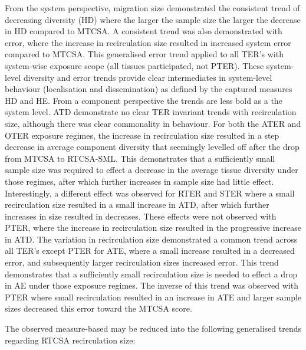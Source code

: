 From the system perspective, migration size demonstrated the consistent trend of decreasing diversity (HD) where the larger the sample size the larger the decrease in HD compared to MTCSA. 
A consistent trend was also demonstrated with error, where the increase in recirculation size resulted in increased system error compared to MTCSA. This generalised error trend applied to all TER's with system-wise exposure scope (all tissues participated, not PTER). These system-level diversity and error trends provide clear intermediates in system-level behaviour (localisation and dissemination) as defined by the captured measures HD and HE.
From a component perspective the trends are less bold as a the system level.
ATD demonstrate no clear TER invariant trends with recirculation size, although there was clear commonality in behaviour. For both the ATER and OTER exposure regimes, the increase in recirculation size resulted in a step decrease in average component diversity that seemingly levelled off after the drop from MTCSA to RTCSA-SML. This demonstrates that a sufficiently small sample size was required to effect a decrease in the average tissue diversity under those regimes, after which further increases in sample size had little effect. Interestingly, a different effect was observed for RTER and STER where a small recirculation size resulted in a small increase in ATD, after which further increases in size resulted in decreases. 
These effects were not observed with PTER, where the increase in recirculation size resulted in the progressive increase in ATD.
The variation in recirculation size demonstrated a common trend across all TER's except PTER for ATE, where a small increase resulted in a decreased error, and subsequently larger recirculation sizes increased error. This trend demonstrates that a sufficiently small recirculation size is needed to effect a drop in AE under those exposure regimes. The inverse of this trend was observed with PTER where small recirculation resulted in an increase in ATE and larger sample sizes decreased this error toward the MTCSA score.

The observed measure-based may be reduced into the following generalised trends regarding RTCSA recirculation size:

